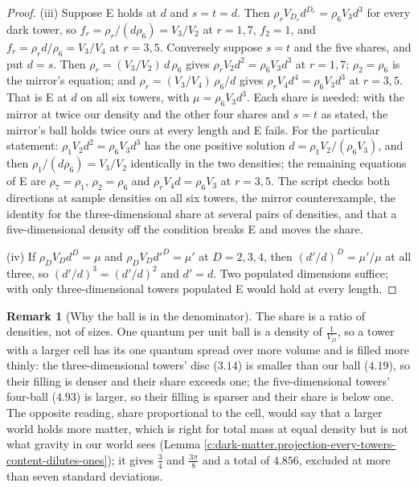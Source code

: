 \documentclass[11pt]{article}
\theoremstyle{definition}
\newtheorem{remark}[theorem]{Remark}
\theoremstyle{plain}
\newcommand{\changedmark}[2]{\marginpar{\raggedright\scriptsize\color{#1}#2}}
\begin{document}
\begin{proof}
(iii) Suppose E holds at $d$ and $s = t = d$. Then $\rho_{r}V_{D_{r}}d^{D_{r}} = \rho_{6}V_{3}d^{3}$ for every dark tower, so $f_{r} = \rho_{r}/(d\rho_{6}) = V_{3}/V_{2}$ at $r = 1, 7$, $f_{2} = 1$, and $f_{r} = \rho_{r}d/\rho_{6} = V_{3}/V_{4}$ at $r = 3, 5$. Conversely suppose $s = t$ and the five shares, and put $d = s$. Then $\rho_{r} = (V_{3}/V_{2})\,d\,\rho_{6}$ gives $\rho_{r}V_{2}d^{2} = \rho_{6}V_{3}d^{3}$ at $r = 1, 7$; $\rho_{2} = \rho_{6}$ is the mirror's equation; and $\rho_{r} = (V_{3}/V_{4})\,\rho_{6}/d$ gives $\rho_{r}V_{4}d^{4} = \rho_{6}V_{3}d^{3}$ at $r = 3, 5$. That is E at $d$ on all six towers, with $\mu = \rho_{6}V_{3}d^{3}$. Each share is needed: with the mirror at twice our density and the other four shares and $s = t$ as stated, the mirror's ball holds twice ours at every length and E fails. For the particular statement: $\rho_{1}V_{2}d^{2} = \rho_{6}V_{3}d^{3}$ has the one positive solution $d = \rho_{1}V_{2}/(\rho_{6}V_{3})$, and then $\rho_{1}/(d\rho_{6}) = V_{3}/V_{2}$ identically in the two densities; the remaining equations of E are $\rho_{7} = \rho_{1}$, $\rho_{2} = \rho_{6}$ and $\rho_{r}V_{4}d = \rho_{6}V_{3}$ at $r = 3, 5$. The script checks both directions at sample densities on all six towers, the mirror counterexample, the identity for the three-dimensional share at several pairs of densities, and that a five-dimensional density off the condition breaks E and moves the share.

(iv) If $\rho_{D}V_{D}d^{D} = \mu$ and $\rho_{D}V_{D}d'^{D} = \mu'$ at $D = 2, 3, 4$, then $(d'/d)^{D} = \mu'/\mu$ at all three, so $(d'/d)^{3} = (d'/d)^{2}$ and $d' = d$. Two populated dimensions suffice; with only three-dimensional towers populated E would hold at every length.

\end{proof}

\begin{remark}[Why the ball is in the denominator]\label{c:note.dark-matter.why-ball-denominator}
\changedmark{BurntOrange}{changed since the deposit}
The share is a ratio of densities, not of sizes. One quantum per unit ball is a density of $\tfrac{1}{V_{D}}$, so a tower with a larger cell has its one quantum spread over more volume and is filled more thinly: the three-dimensional towers' disc ($3.14$) is smaller than our ball ($4.19$), so their filling is denser and their share exceeds one; the five-dimensional towers' four-ball ($4.93$) is larger, so their filling is sparser and their share is below one. The opposite reading, share proportional to the cell, would say that a larger world holds more matter, which is right for total mass at equal density but is not what gravity in our world sees (Lemma \ref{c:dark-matter.projection-every-towers-content-dilutes-ones}); it gives $\tfrac{3}{4}$ and $\tfrac{3\pi}{8}$ and a total of $4.856$, excluded at more than seven standard deviations.
\end{remark}
\end{document}
